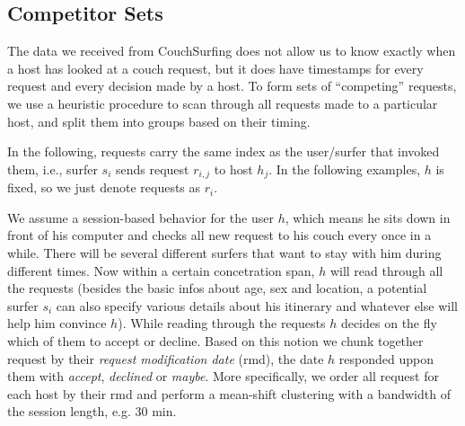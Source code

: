 \subsection{Competitor Sets} \label{subsec:competitor_sets}

The data we received from CouchSurfing does not allow us to know exactly when a host has looked at a couch request, but it does have timestamps for every request and every decision made by a host.
To form sets of ``competing'' requests, we use a heuristic procedure to scan through all requests made to a particular host, and split them into groups based on their timing.

In the following, requests carry the same index as the user/surfer that invoked them, i.e., surfer $s_i$ sends request $r_{i,j}$ to host $h_j$.
In the following examples, $h$ is fixed, so we just denote requests as $r_i$.

We assume a session-based behavior for the user $h$, which means he sits down in front of his computer and checks all new request to his couch every once in a while. There will be several different surfers that want to stay with him during different times. Now within a certain concetration span, $h$ will read through all the requests (besides the basic infos about age, sex and location, a potential surfer $s_i$ can also specify various details about his itinerary and whatever else will help him convince $h$). While reading through the requests $h$ decides on the fly which of them to accept or decline. Based on this notion we chunk together request by their \textit{request modification date} (rmd), the date $h$ responded uppon them with \textit{accept}, \textit{declined} or \textit{maybe}. More specifically, we order all request for each host by their rmd and perform a mean-shift clustering with a bandwidth of the session length, e.g. 30 min.


\begin{figure}[ht]
\centering
{}
\caption{}
\label{fig:timeline_view}
\end{figure}
